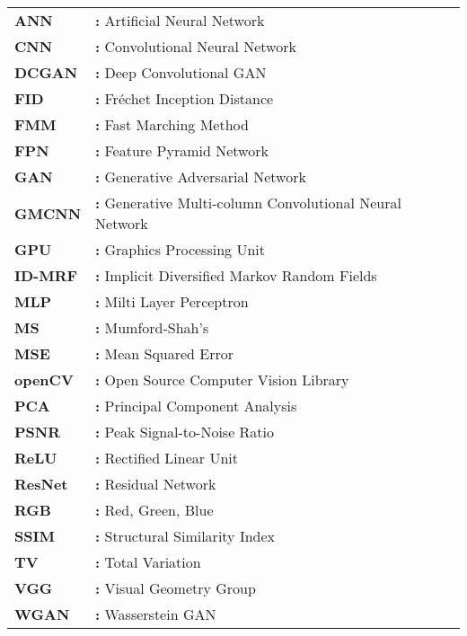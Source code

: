 \hspace{-3mm}

\begin{tabular}{ p{2cm} l }
    {\bf{ANN}} & {\bf:} Artificial Neural Network\\
    {\bf{CNN}} & {\bf:} Convolutional Neural Network\\
    {\bf{DCGAN}} & {\bf:} Deep Convolutional GAN\\
    {\bf{FID}} & {\bf:} Fréchet Inception Distance\\
    {\bf{FMM}} & {\bf:} Fast Marching Method\\
    {\bf{FPN}} & {\bf:} Feature Pyramid Network\\
    {\bf{GAN}} & {\bf:} Generative Adversarial Network\\
    {\bf{GMCNN}} & {\bf:} Generative Multi-column Convolutional Neural Network\\
    {\bf{GPU}} & {\bf:} Graphics Processing Unit\\
    {\bf{ID-MRF}} & {\bf:} Implicit Diversified Markov Random Fields\\
    {\bf{MLP}} & {\bf:} Milti Layer Perceptron\\
    {\bf{MS}} & {\bf:} Mumford-Shah's\\
    {\bf{MSE}} & {\bf:} Mean Squared Error\\
    {\bf{openCV}} & {\bf:} Open Source Computer Vision Library\\
    {\bf{PCA}} & {\bf:} Principal Component Analysis\\
    {\bf{PSNR}} & {\bf:} Peak Signal-to-Noise Ratio\\
    {\bf{ReLU}} & {\bf:} Rectified Linear Unit\\
    {\bf{ResNet}} & {\bf:} Residual Network\\
    {\bf{RGB}} & {\bf:} Red, Green, Blue\\
    {\bf{SSIM}} & {\bf:} Structural Similarity Index\\
    {\bf{TV}} & {\bf:} Total Variation\\
    {\bf{VGG}} & {\bf:} Visual Geometry Group\\
    {\bf{WGAN}} & {\bf:} Wasserstein GAN\\
\end{tabular}

